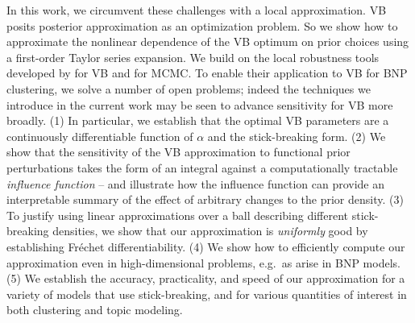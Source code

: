 In this work, we circumvent these challenges with a local approximation. VB
posits posterior approximation as an optimization problem. So we show how to
approximate the nonlinear dependence of the VB optimum on prior choices using a
first-order Taylor series expansion. We build on the local robustness tools
developed by \cite{giordano:2018:covariances} for VB and
\cite{gustafson:1996:local} for MCMC. To enable their application to VB for BNP
clustering, we solve a number of open problems; indeed the techniques we
introduce in the current work may be seen to advance sensitivity for VB more
broadly. (1) In particular, we establish that the optimal VB parameters are a
continuously differentiable function of $\alpha$ and the stick-breaking form.
(2) We show that the sensitivity of the VB approximation to functional prior
perturbations takes the form of an integral against a computationally tractable
\textit{influence function} -- and illustrate how the influence function can
provide an interpretable summary of the effect of arbitrary changes to the prior
density. (3) To justify using linear approximations over a ball describing
different stick-breaking densities, we show that our approximation is
\textit{uniformly} good by establishing Fr\'echet differentiability. (4) We show how
to efficiently compute our approximation even in high-dimensional problems,
e.g.\ as arise in BNP models. (5) We establish the accuracy, practicality, and
speed of our approximation for a variety of models that use stick-breaking, and
for various quantities of interest in both clustering and topic modeling.

